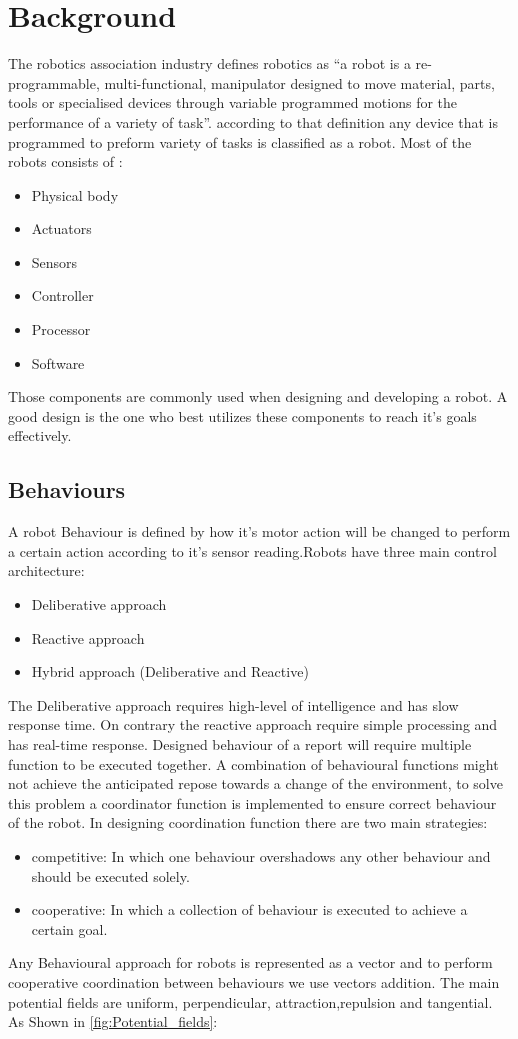 \section{Background} \label{sec:background}
The robotics association industry defines robotics as ``a robot is a re-programmable, multi-functional, manipulator designed to move material, parts, tools or specialised devices through variable programmed motions for the performance of a variety of task''. according to that definition any device that is programmed to preform variety of tasks is classified as a robot. Most of the robots consists of :
\begin{itemize}
	\item Physical body
	\item Actuators
	\item Sensors
	\item Controller
	\item Processor
	\item Software 
\end{itemize}
Those components are commonly used when designing and developing a robot. A good design is the one who best utilizes these components to reach it's goals effectively.
\subsection{Behaviours}
A robot Behaviour is defined by how it's motor action will be changed to perform a certain action according to it's sensor reading.Robots have three main control architecture:
\begin{itemize}
	\item Deliberative approach
	\item Reactive approach
	\item Hybrid approach (Deliberative and Reactive) 
\end{itemize}

The Deliberative approach requires high-level of intelligence and has slow response time. On contrary the reactive approach require simple processing and has real-time response. 
Designed behaviour of a report will require multiple function to be executed together. A combination of behavioural functions might not achieve the anticipated repose towards a change of the environment, to solve this problem a coordinator function is implemented to ensure correct behaviour of the robot. In designing coordination function there are two main strategies:
\begin{itemize}
	\item competitive: In which one behaviour overshadows any other behaviour and should be executed solely.
	\item cooperative: In which a collection of behaviour is executed to achieve a certain goal.
\end{itemize} 
Any Behavioural approach for robots is represented as a vector and to perform cooperative coordination between behaviours we use vectors addition. The main potential fields are uniform, perpendicular, attraction,repulsion and tangential. As Shown in {\ref{fig:Potential_fields}}:


